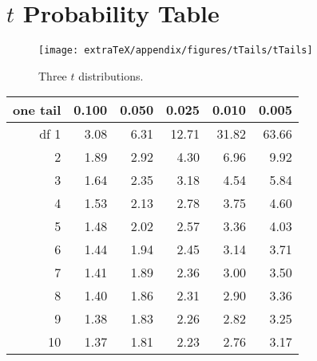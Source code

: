 \section{$t$ Probability Table}
\label{tDistributionTable}

\begin{figure}[h]
\centering
\texttt{[image: extraTeX/appendix/figures/tTails/tTails]}
\caption{Three $t$ distributions.}
\label{tTails}
\end{figure}

\begin{center}
\begin{tabular}{r | rrr rr}
one tail & \hspace{1.5mm}  0.100 & \hspace{1.5mm} 0.050 & \hspace{1.5mm} 0.025 & \hspace{1.5mm} 0.010 & \hspace{1.5mm} 0.005  \\
\hline
{df} \hfill 1  &  {\normalsize  3.08} & {\normalsize  6.31} & {\normalsize 12.71} & {\normalsize 31.82} & {\normalsize 63.66}  \\ 
2  &  {\normalsize  1.89} & {\normalsize  2.92} & {\normalsize  4.30} & {\normalsize  6.96} & {\normalsize  9.92}  \\ 
3  &  {\normalsize  1.64} & {\normalsize  2.35} & {\normalsize  3.18} & {\normalsize  4.54} & {\normalsize  5.84}  \\ 
4  &  {\normalsize  1.53} & {\normalsize  2.13} & {\normalsize  2.78} & {\normalsize  3.75} & {\normalsize  4.60}  \\ 
5  &  {\normalsize  1.48} & {\normalsize  2.02} & {\normalsize  2.57} & {\normalsize  3.36} & {\normalsize  4.03}  \\ 
\hline
6  &  {\normalsize  1.44} & {\normalsize  1.94} & {\normalsize  2.45} & {\normalsize  3.14} & {\normalsize  3.71}  \\ 
7  &  {\normalsize  1.41} & {\normalsize  1.89} & {\normalsize  2.36} & {\normalsize  3.00} & {\normalsize  3.50}  \\ 
8  &  {\normalsize  1.40} & {\normalsize  1.86} & {\normalsize  2.31} & {\normalsize  2.90} & {\normalsize  3.36}  \\ 
9  &  {\normalsize  1.38} & {\normalsize  1.83} & {\normalsize  2.26} & {\normalsize  2.82} & {\normalsize  3.25}  \\ 
10  &  {\normalsize  1.37} & {\normalsize  1.81} & {\normalsize  2.23} & {\normalsize  2.76} & {\normalsize  3.17}  \\ 

\end{tabular}
\end{center}
